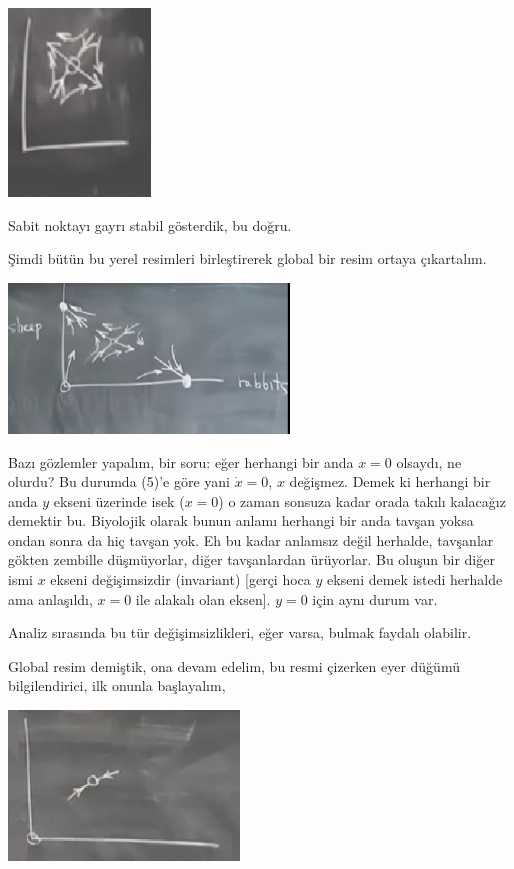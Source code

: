 \documentclass[12pt,fleqn]{article}\usepackage{../../common}
\begin{document}
\includegraphics[height=5cm]{06_10.png}

Sabit noktayı gayrı stabil gösterdik, bu doğru. 

Şimdi bütün bu yerel resimleri birleştirerek global bir resim ortaya
çıkartalım. 

\includegraphics[height=4cm]{06_11.png}

Bazı gözlemler yapalım, bir soru: eğer herhangi bir anda $x=0$ olsaydı, ne
olurdu? Bu durumda (5)'e göre yani $\dot{x}=0$, $x$ değişmez. Demek ki herhangi
bir anda $y$ ekseni üzerinde isek ($x=0$) o zaman sonsuza kadar orada takılı
kalacağız demektir bu. Biyolojik olarak bunun anlamı herhangi bir anda tavşan
yoksa ondan sonra da hiç tavşan yok. Eh bu kadar anlamsız değil herhalde,
tavşanlar gökten zembille düşmüyorlar, diğer tavşanlardan ürüyorlar. Bu oluşun
bir diğer ismi $x$ ekseni değişimsizdir (invariant) [gerçi hoca $y$ ekseni demek
  istedi herhalde ama anlaşıldı, $x=0$ ile alakalı olan eksen]. $y=0$ için aynı
durum var.

Analiz sırasında bu tür değişimsizlikleri, eğer varsa, bulmak faydalı olabilir. 

Global resim demiştik, ona devam edelim, bu resmi çizerken eyer düğümü
bilgilendirici, ilk onunla başlayalım,

\includegraphics[height=4cm]{06_12.png}
\end{document}
